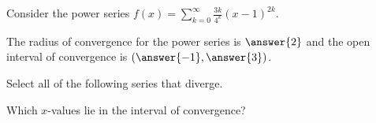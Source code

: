 \documentclass{ximera}
\author{Jim Talamo}
\begin{document}
\begin{exercise}
Consider the power series $f(x) = \sum_{k=0}^{\infty} \frac{3k}{4^k}(x-1)^{2k}$.

The radius of convergence for the power series is $\answer{2}$ and the open interval of convergence is $\left(\answer{-1},\answer{3}\right)$.

\begin{exercise}
Select all of the following series that diverge.
\begin{selectAll}
\end{selectAll}
\begin{hint}
Which $x$-values lie in the interval of convergence?
\end{hint}
\end{exercise}
\end{exercise}
\end{document}
